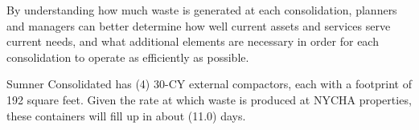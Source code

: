 
    By understanding how much waste is generated at each consolidation, planners and managers
    can better determine how well current assets and services serve current needs, and what additional 
    elements are necessary in order for each consolidation to operate as efficiently as possible. 

    Sumner Consolidated has (4) 30-CY external compactors, each with a footprint of 192 square feet. Given the rate at which waste is produced at NYCHA properties, these containers will fill
    up in about (11.0) days.